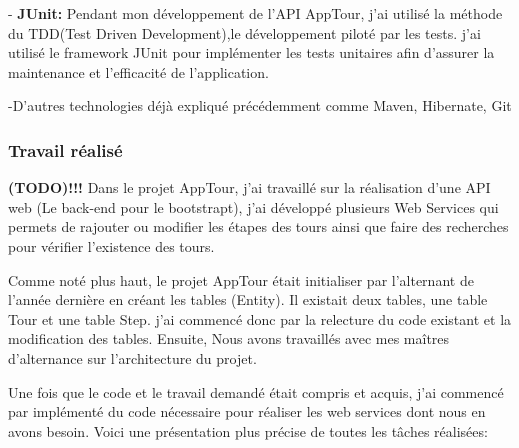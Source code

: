 \documentclass[12pt]{article}
\begin{document}
- \textbf{JUnit:} Pendant mon développement de l'API AppTour, j'ai utilisé la méthode du TDD(Test Driven Development),le développement piloté par les tests. j'ai utilisé le framework JUnit pour implémenter les tests unitaires afin d'assurer la maintenance et l'efficacité de l’application.

-D'autres technologies déjà expliqué précédemment comme Maven, Hibernate, Git
 
\subsubsection{Travail réalisé}
\textbf{(TODO)!!!}\newline
Dans le projet AppTour, j'ai travaillé sur la réalisation d'une API web (Le back-end pour le bootstrapt), j'ai développé plusieurs Web Services qui permets de rajouter ou modifier les étapes des tours ainsi que faire des recherches pour vérifier l’existence des tours. 

Comme noté plus haut, le projet AppTour était initialiser par l'alternant de l'année dernière en créant les tables (Entity). Il existait deux tables, une table Tour et une table Step. j'ai commencé donc par la relecture du code existant et la modification des tables.
Ensuite, Nous avons travaillés avec mes maîtres d'alternance sur l'architecture du projet.

Une fois que le code et le travail demandé était compris et acquis, j'ai commencé par implémenté du code nécessaire pour réaliser les web services dont nous en avons besoin. Voici une présentation plus précise de toutes les tâches réalisées:   
\end{document}
